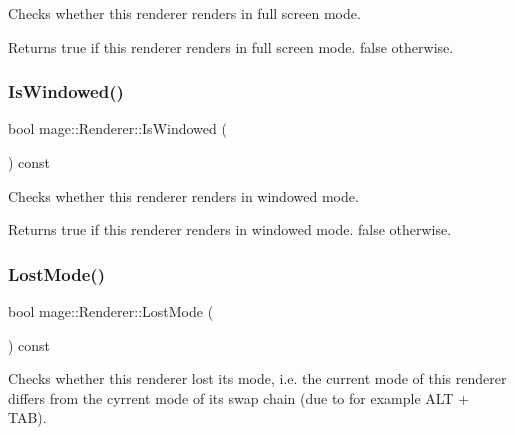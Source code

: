 Checks whether this renderer renders in full screen mode.

\begin{DoxyReturn}{Returns}
{\ttfamily true} if this renderer renders in full screen mode. {\ttfamily false} otherwise. 
\end{DoxyReturn}
\hypertarget{classmage_1_1_renderer_a1de1804c1eedae7dc12435a520a10b9c}{}\label{classmage_1_1_renderer_a1de1804c1eedae7dc12435a520a10b9c} 
\subsubsection{\texorpdfstring{Is\+Windowed()}{IsWindowed()}}
{\footnotesize\ttfamily bool mage\+::\+Renderer\+::\+Is\+Windowed (\begin{DoxyParamCaption}{ }\end{DoxyParamCaption}) const}

Checks whether this renderer renders in windowed mode.

\begin{DoxyReturn}{Returns}
{\ttfamily true} if this renderer renders in windowed mode. {\ttfamily false} otherwise. 
\end{DoxyReturn}
\hypertarget{classmage_1_1_renderer_afdde83a1e2bc9288f000fb2575c525d0}{}\label{classmage_1_1_renderer_afdde83a1e2bc9288f000fb2575c525d0} 
\subsubsection{\texorpdfstring{Lost\+Mode()}{LostMode()}}
{\footnotesize\ttfamily bool mage\+::\+Renderer\+::\+Lost\+Mode (\begin{DoxyParamCaption}{ }\end{DoxyParamCaption}) const}

Checks whether this renderer lost its mode, i.\+e. the current mode of this renderer differs from the cyrrent mode of its swap chain (due to for example A\+LT + T\+AB). \hypertarget{classmage_1_1_renderer_a95a34b64e815b0e5e95ce539bbd0f5a3}{}\label{classmage_1_1_renderer_a95a34b64e815b0e5e95ce539bbd0f5a3} 
